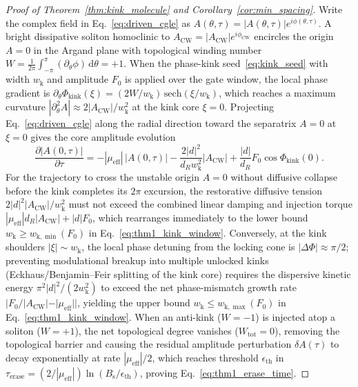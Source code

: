 \documentclass[11pt,letterpaper]{article}
\begin{document}
\begin{proof}[Proof of Theorem~\ref{thm:kink_molecule} and Corollary~\ref{cor:min_spacing}]
Write the complex field in Eq.~\eqref{eq:driven_cgle} as $A(\theta, \tau) = |A(\theta, \tau)|e^{i\phi(\theta, \tau)}$. A bright dissipative soliton homoclinic to $A_{\mathrm{CW}} = |A_{\mathrm{CW}}|e^{i\phi_{\mathrm{CW}}}$ encircles the origin $A = 0$ in the Argand plane with topological winding number $W = \frac{1}{2\pi}\int_{-\pi}^{\pi} (\partial_\theta \phi)\,\mathrm{d}\theta = +1$. When the phase-kink seed~\eqref{eq:kink_seed} with width $w_{\mathrm{k}}$ and amplitude $F_0$ is applied over the gate window, the local phase gradient is $\partial_\theta \Phi_{\mathrm{kink}}(\xi) = (2W/w_{\mathrm{k}})\,\mathrm{sech}(\xi/w_{\mathrm{k}})$, which reaches a maximum curvature $|\partial_\theta^2 A| \approx 2|A_{\mathrm{CW}}|/w_{\mathrm{k}}^2$ at the kink core $\xi = 0$. Projecting Eq.~\eqref{eq:driven_cgle} along the radial direction toward the separatrix $A = 0$ at $\xi = 0$ gives the core amplitude evolution
\begin{equation}
\frac{\partial |A(0, \tau)|}{\partial \tau} = -|\mu_{\mathrm{eff}}|\,|A(0, \tau)| - \frac{2|d|^2}{d_R w_{\mathrm{k}}^2}|A_{\mathrm{CW}}| + \frac{|d|}{d_R}F_0 \cos\Phi_{\mathrm{kink}}(0).
\label{eq:appA_core}
\end{equation}
For the trajectory to cross the unstable origin $A = 0$ without diffusive collapse before the kink completes its $2\pi$ excursion, the restorative diffusive tension $2|d|^2|A_{\mathrm{CW}}|/w_{\mathrm{k}}^2$ must not exceed the combined linear damping and injection torque $|\mu_{\mathrm{eff}}|d_R|A_{\mathrm{CW}}| + |d|F_0$, which rearranges immediately to the lower bound $w_{\mathrm{k}} \ge w_{\mathrm{k},\min}(F_0)$ in Eq.~\eqref{eq:thm1_kink_window}. Conversely, at the kink shoulders $|\xi| \sim w_{\mathrm{k}}$, the local phase detuning from the locking cone is $|\Delta\Phi| \approx \pi/2$; preventing modulational breakup into multiple unlocked kinks (Eckhaus/Benjamin--Feir splitting of the kink core) requires the dispersive kinetic energy $\pi^2|d|^2 / (2w_{\mathrm{k}}^2)$ to exceed the net phase-mismatch growth rate $|F_0/|A_{\mathrm{CW}}| - |\mu_{\mathrm{eff}}||$, yielding the upper bound $w_{\mathrm{k}} \le w_{\mathrm{k},\max}(F_0)$ in Eq.~\eqref{eq:thm1_kink_window}. When an anti-kink ($W = -1$) is injected atop a soliton ($W = +1$), the net topological degree vanishes ($W_{\mathrm{tot}} = 0$), removing the topological barrier and causing the residual amplitude perturbation $\delta A(\tau)$ to decay exponentially at rate $|\mu_{\mathrm{eff}}|/2$, which reaches threshold $\epsilon_{\mathrm{th}}$ in $\tau_{\mathrm{erase}} = (2/|\mu_{\mathrm{eff}}|)\ln(B_{\mathrm{s}}/\epsilon_{\mathrm{th}})$, proving Eq.~\eqref{eq:thm1_erase_time}.


\end{proof}
\end{document}
